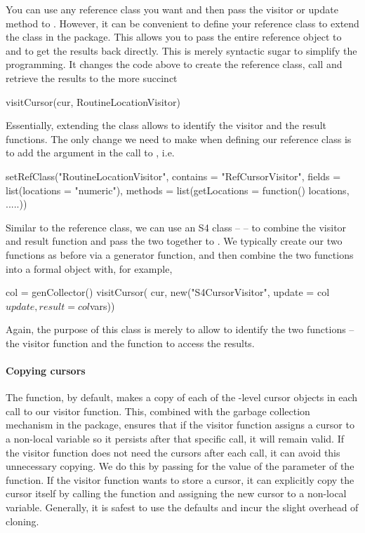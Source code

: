 You can use any reference class you want and then pass the visitor or
update method to .  However, it can be convenient to
define your reference class to extend the  class in
the  package. This allows you to pass the entire
reference object to  and to get the results back
directly. This is merely syntactic sugar to simplify the
programming. It changes the code above to create the reference class,
call  and retrieve the results to the more succinct
\begin{RCode}
visitCursor(cur, RoutineLocationVisitor)
\end{RCode}
Essentially, extending the  class allows
 to identify the visitor and the result functions.
The only change we need to make when defining our reference class
is to add the  argument in the call to
, i.e.
\begin{RCode}
setRefClass("RoutineLocationVisitor",
            contains = "RefCursorVisitor",
            fields = list(locations = "numeric"),
            methods = list(getLocations = function() locations,
                       .....))
\end{RCode}



Similar to the  reference class, we can use
an S4 class --  -- to combine the visitor and
result function and pass the two together to .  We
typically create our two functions as before via a generator function,
and then combine the two functions into a formal object with, for
example,
\begin{RCode}
col = genCollector()
visitCursor( cur, new("S4CursorVisitor",  update = col$update, result = col$vars))
\end{RCode}
Again, the purpose of this  class is merely to
allow  to identify the two functions -- the visitor
function and the function to access the results.


\paragraph{Copying cursors}
The  function, by default, makes a copy of each of
the \C-level cursor objects in each call to our visitor function.
This, combined with the garbage collection mechanism in the package,
ensures that if the visitor function assigns a cursor to a non-local
variable so it persists after that specific call, it will remain
valid.  If the visitor function does not need the cursors after each
call, it can avoid this unnecessary copying.  We do this by passing
\Rfalse{} for the value of the  parameter of the
 function.  If the visitor function wants to store
a cursor, it can explicitly copy the cursor itself by calling the
 function and assigning the new cursor to a non-local
variable.  Generally, it is safest to use the defaults and incur the
slight overhead of cloning.


